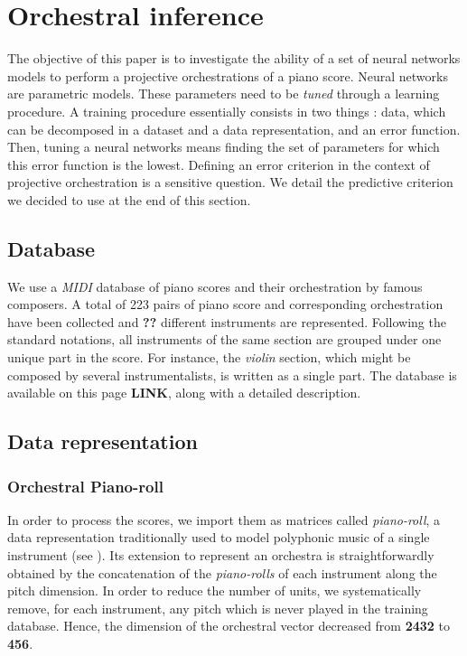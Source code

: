 \documentclass{article}
\begin{document}
\section{Orchestral inference}
The objective of this paper is to investigate the ability of a set of neural networks models to perform a projective orchestrations of a piano score. 
Neural networks are parametric models. These parameters need to be \textit{tuned} through a learning procedure.
A training procedure essentially consists in two things : data, which can be decomposed in a dataset and a data representation, and an error function. Then, tuning a neural networks means finding the set of parameters for which this error function is the lowest. Defining an error criterion in the context of projective orchestration is a sensitive question. We detail the predictive criterion we decided to use at the end of this section.

\subsection{Database}
We use a \textit{MIDI} database of piano scores and their orchestration by famous composers. A total of 223 pairs of piano score and corresponding orchestration have been collected and \textbf{??} different instruments are represented. 
Following the standard notations, all instruments of the same section are grouped under one unique part in the score. For instance, the \textit{violin} section, which might be composed by several instrumentalists, is written as a single part.
The database is available on this page \textbf{LINK}, along with a detailed description.

\subsection{Data representation}
\subsubsection{Orchestral Piano-roll}
In order to process the scores, we import them as matrices called \textit{piano-roll}, a data representation traditionally used to model polyphonic music of a single instrument (see ). 
Its extension to represent an orchestra is straightforwardly obtained by the concatenation of the \textit{piano-rolls} of each instrument along the pitch dimension.
In order to reduce the number of units, we systematically remove, for each instrument, any pitch which is never played in the training database. Hence, the dimension of the orchestral vector decreased from \textbf{2432} to \textbf{456}.
\end{document}
